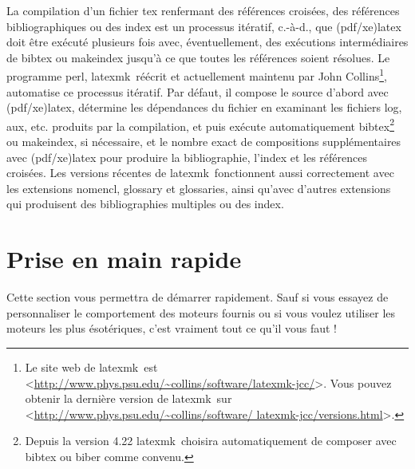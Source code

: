 \documentclass[11pt,french]{article}
\newcommand{\TS}{\textsf{\TeX Shop}}
\newcommand{\latexmk}{\textsf{latexmk}}
\newcommand{\mnu}[1]{\textsf{#1}}
\newcommand{\cmd}[1]{\textsf{#1}}
\newcommand{\To}{\,\(\to\)\,}
\begin{document}
La compilation d'un fichier \cmd{tex} renfermant des références croisées, des références bibliographiques ou des index est un processus itératif, c.-à-d., que (\cmd{pdf/xe)latex} doit être exécuté plusieurs fois avec, éventuellement, des exécutions intermédiaires de \cmd{bibtex} ou \cmd{makeindex} jusqu'à ce que toutes les références soient résolues. Le programme \cmd{perl}, \latexmk\, réécrit et actuellement maintenu par John Collins\footnote{Le site web de \latexmk\ est <\url{http://www.phys.psu.edu/~collins/software/latexmk-jcc/}>.
Vous pouvez obtenir la dernière version de \latexmk\ sur <\url{http://www.phys.psu.edu/~collins/software/
latexmk-jcc/versions.html}>.}, automatise ce processus itératif. Par défaut, il compose le source d'abord avec (\cmd{pdf/xe)latex}, détermine les dépendances du fichier en examinant les fichiers \cmd{log}, \cmd{aux}, etc. produits par la compilation, et puis exécute automatiquement \cmd{bibtex}\footnote{Depuis la version 4.22 \latexmk\ choisira automatiquement de composer avec \cmd{bibtex} ou \cmd{biber} comme convenu.} ou \cmd{makeindex}, si nécessaire, et le nombre exact de compositions supplémentaires avec (\cmd{pdf/xe)latex} pour produire la bibliographie, l'index et les références croisées. Les versions récentes de \latexmk\ fonctionnent aussi correctement avec les extensions \cmd{nomencl}, \cmd{glossary} et \cmd{glossaries}, ainsi qu'avec d'autres extensions qui produisent des bibliographies multiples ou des index.


%

\section{Prise en main rapide}

Cette section vous permettra de démarrer rapidement. Sauf si vous essayez de personnaliser le comportement des moteurs fournis ou si vous voulez utiliser les moteurs les plus ésotériques, c'est vraiment tout ce qu'il vous faut !

%
\end{document}
